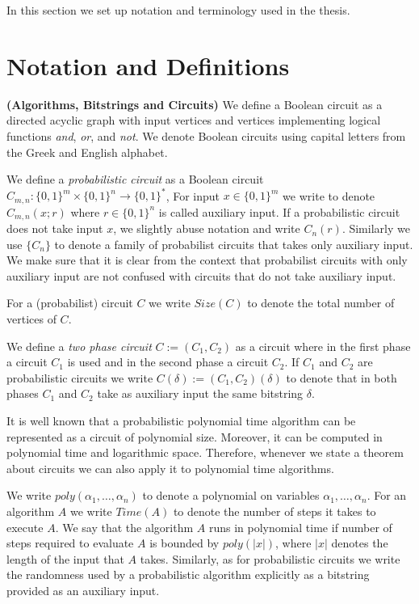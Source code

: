 In this section we set up notation and terminology used in the thesis.
%
\section{Notation and Definitions}
\textbf{(Algorithms, Bitstrings and Circuits)}
We define a Boolean circuit as a directed acyclic graph with input vertices and vertices implementing logical functions \textit{and}, \textit{or}, and \textit{not}.
We denote Boolean circuits using capital letters from the Greek and English alphabet.

We define a \textit{probabilistic circuit} as a Boolean circuit $C_{m,n} : \{0,1\}^{m} \times \{0,1\}^{n} \rightarrow \{0,1\}^{*}$,
For input $x \in \{0,1\}^{m}$ we write to denote $C_{m,n}(x;r)$ where $r \in \{0,1\}^{n}$ is called auxiliary input.
If a probabilistic circuit does not take input $x$, we slightly abuse notation and write $C_{n}(r)$.
Similarly we use $\{C_n\}$ to denote a family of probabilist circuits that takes only auxiliary input.
We make sure that it is clear from the context that probabilist circuits with only auxiliary input
are not confused with circuits that do not take auxiliary input.

For a (probabilist) circuit $C$ we write $\mathit{Size}(C)$ to denote the total number of vertices of $C$.

We define a \textit{two phase circuit} $C := (C_1, C_2)$ as a circuit where in the first phase a circuit $C_1$ is used and in the second phase a circuit $C_2$.
If $C_1$ and $C_2$ are probabilistic circuits we write $C(\delta) := (C_1, C_2)(\delta)$ to denote that in both phases $C_1$ and $C_2$ take
as auxiliary input the same bitstring $\delta$.

It is well known \cite{Arora:2009:CCM:1540612} that a probabilistic polynomial time algorithm can be represented as a circuit of polynomial size.
Moreover, it can be computed in polynomial time and logarithmic space.
Therefore, whenever we state a theorem about circuits we can also apply it to polynomial time algorithms.

We write $\mathit{poly}(\alpha_1, \dots, \alpha_n)$ to denote a polynomial on variables $\alpha_1, \dots, \alpha_n$.
For an algorithm $A$ we write $\mathit{Time}(A)$ to denote the number of steps it takes to execute $A$.
We say that the algorithm $A$ runs in polynomial time if number of steps required to evaluate $A$ is bounded by $poly(|x|)$, where $|x|$ denotes
the length of the input that $A$ takes.
Similarly, as for probabilistic circuits we write the randomness used by a probabilistic algorithm explicitly as a bitstring provided as an auxiliary input.

